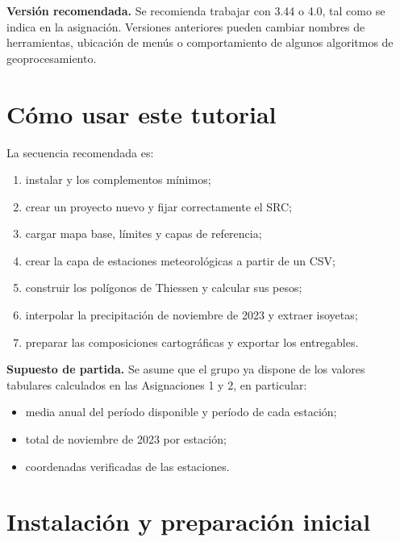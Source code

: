 \documentclass[11pt]{article}
\begin{document}
\begin{warnbox}
\textbf{Versión recomendada.}
Se recomienda trabajar con \qgis{} 3.44 o 4.0, tal como se indica en la
asignación. Versiones anteriores pueden cambiar nombres de herramientas,
ubicación de menús o comportamiento de algunos algoritmos de geoprocesamiento.
\end{warnbox}

\section*{Cómo usar este tutorial}

La secuencia recomendada es:
\begin{enumerate}
  \item instalar \qgis{} y los complementos mínimos;
  \item crear un proyecto nuevo y fijar correctamente el SRC;
  \item cargar mapa base, límites y capas de referencia;
  \item crear la capa de estaciones meteorológicas a partir de un CSV;
  \item construir los polígonos de Thiessen y calcular sus pesos;
  \item interpolar la precipitación de noviembre de 2023 y extraer isoyetas;
  \item preparar las composiciones cartográficas y exportar los entregables.
\end{enumerate}

\begin{olivebox}
\textbf{Supuesto de partida.}
Se asume que el grupo ya dispone de los valores tabulares calculados en las
Asignaciones 1 y 2, en particular:
\begin{itemize}
  \item media anual del período disponible y período de cada estación;
  \item total de noviembre de 2023 por estación;
  \item coordenadas verificadas de las estaciones.
\end{itemize}
\end{olivebox}

\section{Instalación y preparación inicial}
\end{document}
